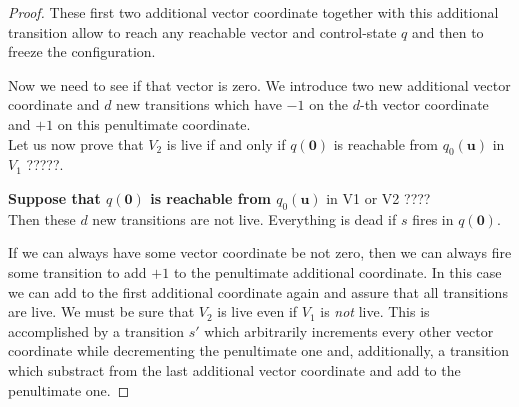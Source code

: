 \begin{proof}
These first two additional vector coordinate together with this additional transition allow
to reach any reachable vector and control-state $q$ and then to freeze the configuration.


Now we need to see if that vector is zero.
We introduce two new additional vector coordinate and $d$ new transitions which have
$-1$ on the $d$-th vector coordinate and $+1$ on this penultimate coordinate. \\


Let us now prove that $V_2$ is live if and only if 
$q(\textbf{0})$
is reachable from $q_0(\textbf{u})$ in $V_1$ ?????.

{\bf Suppose that $q(\textbf{0})$ is reachable from $q_0(\textbf{u})$} in V1 or V2 ????\\
Then these  $d$ new transitions are not live. Everything  is dead if $s$ fires in $q(\textbf{0})$.


If we can always have some vector coordinate be not zero, then we can always fire some transition to add $+1$ to the penultimate additional coordinate.
In this case we can add to the first additional coordinate again and assure that all transitions are live.
We must be sure that $V_2$ is live even if $V_1$ is {\em not} live.
This is accomplished by a transition $s'$  
which arbitrarily increments every other vector coordinate 
while decrementing the penultimate one and, additionally, a transition which 
substract from the last additional vector coordinate and add to the penultimate one. 


\end{proof}
